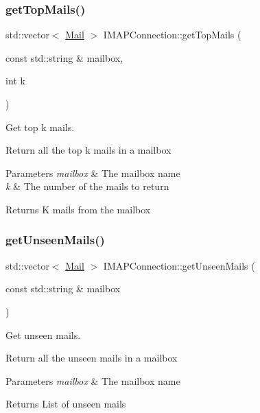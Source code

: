 \subsubsection{\texorpdfstring{get\+Top\+Mails()}{getTopMails()}}
{\footnotesize\ttfamily std\+::vector$<$ \hyperlink{structMail}{Mail} $>$ I\+M\+A\+P\+Connection\+::get\+Top\+Mails (\begin{DoxyParamCaption}\item[{const std\+::string \&}]{mailbox,  }\item[{int}]{k }\end{DoxyParamCaption})}



Get top k mails. 

Return all the top k mails in a mailbox


\begin{DoxyParams}{Parameters}
{\em mailbox} & The mailbox name \\
\hline
{\em k} & The number of the mails to return\\
\hline
\end{DoxyParams}
\begin{DoxyReturn}{Returns}
K mails from the mailbox 
\end{DoxyReturn}
\mbox{\label{classIMAPConnection_ac4fdf095774add4ec038c2738074c4b8}} 
\subsubsection{\texorpdfstring{get\+Unseen\+Mails()}{getUnseenMails()}}
{\footnotesize\ttfamily std\+::vector$<$ \hyperlink{structMail}{Mail} $>$ I\+M\+A\+P\+Connection\+::get\+Unseen\+Mails (\begin{DoxyParamCaption}\item[{const std\+::string \&}]{mailbox }\end{DoxyParamCaption})}



Get unseen mails. 

Return all the unseen mails in a mailbox


\begin{DoxyParams}{Parameters}
{\em mailbox} & The mailbox name \\
\hline
\end{DoxyParams}
\begin{DoxyReturn}{Returns}
List of unseen mails 
\end{DoxyReturn}
\mbox{\label{classIMAPConnection_a13d2dba8599abbbf52bc6e1eb4b7db82}} 

